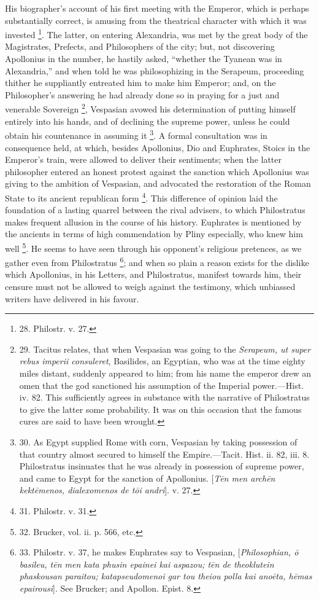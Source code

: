His biographer's account of
his first meeting with the Emperor, which is perhaps substantially
correct, is amusing from the theatrical character with which it was
invested \footnote{28.
Philostr. v. 27.}. The latter,
on entering Alexandria, was met by the great body of the Magistrates,
Prefects, and Philosophers of the city; but, not discovering
Apollonius in the number, he hastily asked, ``whether the Tyanean was
in Alexandria,'' and when told he was philosophizing in the Serapeum,
proceeding thither he suppliantly entreated him to make him Emperor;
and, on the Philosopher's answering he had already done so in praying
for a just and venerable Sovereign \footnote{29.
Tacitus relates, that when Vespasian was going to the \emph{Serapeum, ut
super rebus imperii consuleret}, Basilides, an Egyptian, who was at
the time eighty miles distant, suddenly appeared to him; from his name
the emperor drew an omen that the god sanctioned his assumption of the
Imperial power.—Hist. iv. 82. This sufficiently agrees in substance
with the narrative of Philostratus to give the latter some
probability. It was on this occasion that the famous cures are said to
have been wrought.}, Vespasian avowed his determination of putting himself
entirely into his hands, and of declining the supreme power, unless he
could obtain his countenance in assuming it \footnote{30.
As Egypt supplied Rome with corn, Vespasian by taking possession of
that country almost secured to himself the Empire.—Tacit. Hist. ii.
82, iii. 8. Philostratus insinuates that he was already in possession
of supreme power, and came to Egypt for the sanction of Apollonius. [\emph{T\={e}n
men arch\={e}n kekt\={e}menos, dialexomenos de t\={o}i andri}].
v. 27.}. A formal consultation was in consequence held, at which,
besides Apollonius, Dio and Euphrates, Stoics in the Emperor's train,
were allowed to deliver their sentiments; when the latter philosopher
entered an honest protest against the sanction which Apollonius was
giving to the ambition of Vespasian, and advocated the restoration of
the Roman State to its ancient republican form \footnote{31.
Philostr. v. 31.}. This difference of opinion laid the foundation of a lasting
quarrel between the rival advisers, to which Philostratus makes
frequent allusion in the course of his history. Euphrates is mentioned
by the ancients in terms of high commendation by Pliny especially, who
knew him well \footnote{32.
Brucker, vol. ii. p. 566, etc.}. He
seems to have seen through his opponent's religious pretences, as we
gather even from Philostratus \footnote{33.
Philostr. v. 37, he makes Euphrates say to Vespasian, [\emph{Philosophian,
\={o} basileu, t\={e}n men kata phusin epainei kai aspazou; t\={e}n
de theoklutein phaskousan paraitou; katapseudomenoi gar tou theiou
polla kai ano\={e}ta, h\={e}mas epairousi}]. See Brucker; and
Apollon. Epist. 8.}; and when so plain a reason exists for the dislike which
Apollonius, in his Letters, and Philostratus, manifest towards him,
their censure must not be allowed to weigh against the testimony,
which unbiassed writers have delivered in his favour.

